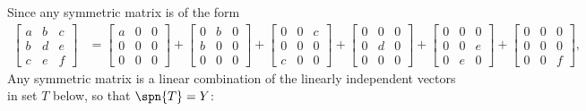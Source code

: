 Since any symmetric matrix is of the form
\begin{align*}
\begin{bmatrix} a & b & c \\ b & d & e \\ c & e & f \end{bmatrix} 
&= 
\begin{bmatrix} a & 0 & 0 \\ 0 & 0 & 0 \\ 0 & 0 & 0 \end{bmatrix} + 
\begin{bmatrix} 0 & b & 0 \\ b & 0 & 0 \\ 0 & 0 & 0 \end{bmatrix} + 
\begin{bmatrix} 0 & 0 & c \\ 0 & 0 & 0 \\ c & 0 & 0 \end{bmatrix} + 
\begin{bmatrix} 0 & 0 & 0 \\ 0 & d & 0 \\ 0 & 0 & 0 \end{bmatrix} + 
\begin{bmatrix} 0 & 0 & 0 \\ 0 & 0 & e \\ 0 & e & 0 \end{bmatrix} + 
\begin{bmatrix} 0 & 0 & 0 \\ 0 & 0 & 0 \\ 0 & 0 & f \end{bmatrix},
\end{align*}
Any symmetric matrix is a linear combination of the linearly independent vectors in set $T$ below, so that $\spn{T} = Y$:
